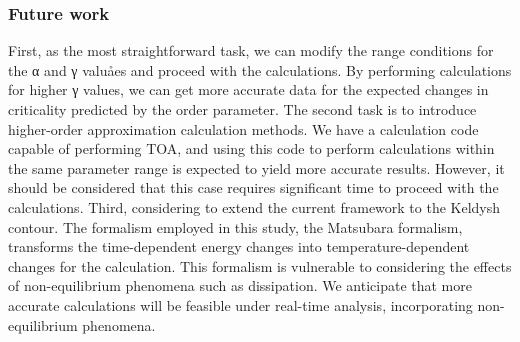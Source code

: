 \documentclass{article}
\numberwithin{equation}{section}
\begin{document}
\begin{spacing}{1.5}
\subsubsection*{Future work}
First, as the most straightforward task, we can modify the range conditions for the α and γ valuåes and proceed with the calculations. By performing calculations for higher γ values, we can get more accurate data for the expected changes in criticality predicted by the order parameter.
The second task is to introduce higher-order approximation calculation methods. We have a calculation code capable of performing TOA, and using this code to perform calculations within the same parameter range is expected to yield more accurate results. However, it should be considered that this case requires significant time to proceed with the calculations.
Third, considering to extend the current framework to the Keldysh contour. The formalism employed in this study, the Matsubara formalism, transforms the time-dependent energy changes into temperature-dependent changes for the calculation. This formalism is vulnerable to considering the effects of non-equilibrium phenomena such as dissipation. We anticipate that more accurate calculations will be feasible under real-time analysis, incorporating non-equilibrium phenomena.
\end{spacing}
\pagebreak
\newpage
\appendix
\end{document}
